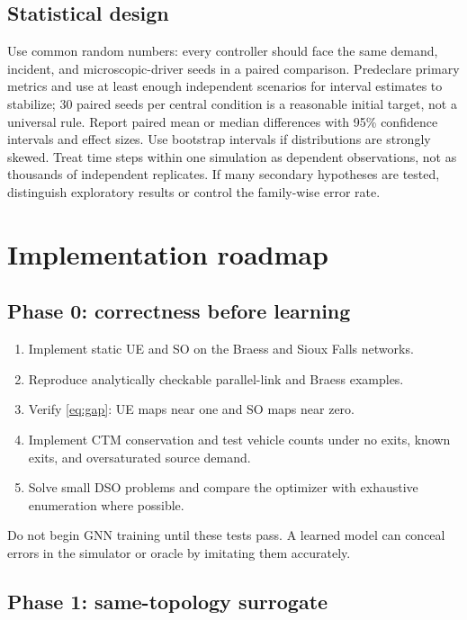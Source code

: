 \documentclass[11pt]{article}
\begin{document}
\subsection{Statistical design}

Use common random numbers: every controller should face the same demand, incident, and
microscopic-driver seeds in a paired comparison.  Predeclare primary metrics and use
at least enough independent scenarios for interval estimates to stabilize; 30 paired
seeds per central condition is a reasonable initial target, not a universal rule.
Report paired mean or median differences with 95\% confidence intervals and effect
sizes.  Use bootstrap intervals if distributions are strongly skewed.  Treat time
steps within one simulation as dependent observations, not as thousands of independent
replicates.  If many secondary hypotheses are tested, distinguish exploratory results
or control the family-wise error rate.

\section{Implementation roadmap}

\subsection{Phase 0: correctness before learning}

\begin{enumerate}[leftmargin=1.5em]
  \item Implement static UE and SO on the Braess and Sioux Falls networks.
  \item Reproduce analytically checkable parallel-link and Braess examples.
  \item Verify \cref{eq:gap}: UE maps near one and SO maps near zero.
  \item Implement CTM conservation and test vehicle counts under no exits, known exits,
  and oversaturated source demand.
  \item Solve small DSO problems and compare the optimizer with exhaustive enumeration
  where possible.
\end{enumerate}

Do not begin GNN training until these tests pass.  A learned model can conceal errors in
the simulator or oracle by imitating them accurately.

\subsection{Phase 1: same-topology surrogate}
\end{document}
